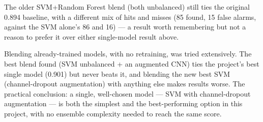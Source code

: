 The older SVM+Random Forest blend (both unbalanced) still ties the original 0.894 baseline, with
a different mix of hits and misses (85 found, 15 false alarms, against the SVM alone's 86 and
16) --- a result worth remembering but not a reason to prefer it over either single-model result
above.

\begin{summarybox}
Blending already-trained models, with no retraining, was tried extensively. The best blend found
(SVM unbalanced + an augmented CNN) ties the project's best single model (0.901) but never beats
it, and blending the new best SVM (channel-dropout augmentation) with anything else makes results
worse. The practical conclusion: a single, well-chosen model --- SVM with channel-dropout
augmentation --- is both the simplest and the best-performing option in this project, with no
ensemble complexity needed to reach the same score.
\end{summarybox}
